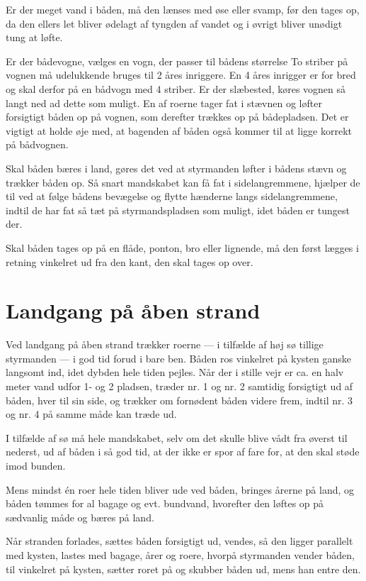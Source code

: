 \documentclass{article}
\begin{document}
Er der meget vand i båden, må den lænses med øse eller svamp, før den
tages op, da den ellers let bliver ødelagt af tyngden af vandet og i
øvrigt bliver unødigt tung at løfte.

Er der bådevogne, vælges en vogn, der passer til bådens størrelse To
striber på vognen må udelukkende bruges til 2 åres inriggere. En 4 åres
inrigger er for bred og skal derfor på en bådvogn med 4 striber. Er der
slæbested, køres vognen så langt ned ad dette som muligt. En af roerne
tager fat i stævnen og løfter forsigtigt båden op på vognen, som derefter
trækkes op på bådepladsen. Det er vigtigt at holde øje med, at bagenden
af båden også kommer til at ligge korrekt på bådvognen.

Skal båden bæres i land, gøres det ved at styrmanden løfter i bådens
stævn og trækker båden op. Så snart mandskabet kan få fat i
sidelangremmene, hjælper de til ved at følge bådens bevægelse og flytte
hænderne langs sidelangremmene, indtil de har fat så tæt på
styrmandspladsen som muligt, idet båden er tungest der.

Skal båden tages op på en flåde, ponton, bro eller lignende, må den først
lægges i retning vinkelret ud fra den kant, den skal tages op over.

\section{Landgang på åben strand}

Ved landgang på åben strand trækker roerne --- i tilfælde af høj sø
tillige styrmanden --- i god tid forud i bare ben. Båden ros vinkelret på
kysten ganske langsomt ind, idet dybden hele tiden pejles. Når der i
stille vejr er ca. en halv meter vand udfor 1- og 2 pladsen, træder nr. 1
og nr. 2 samtidig forsigtigt ud af båden, hver til sin side, og trækker
om fornødent båden videre frem, indtil nr. 3 og nr. 4 på samme måde kan
træde ud.

I tilfælde af sø må hele mandskabet, selv om det skulle blive vådt fra
øverst til nederst, ud af båden i så god tid, at der ikke er spor af fare
for, at den skal støde imod bunden.

Mens mindst én roer hele tiden bliver ude ved båden, bringes årerne på
land, og båden tømmes for al bagage og evt. bundvand, hvorefter den
løftes op på sædvanlig måde og bæres på land.

Når stranden forlades, sættes båden forsigtigt ud, vendes, så den ligger
parallelt med kysten, lastes med bagage, årer og roere, hvorpå styrmanden
vender båden, til vinkelret på kysten, sætter roret på og skubber båden
ud, mens han entre den.
\end{document}
